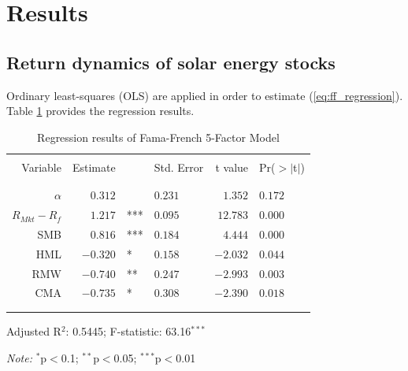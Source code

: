 \documentclass[11pt]{article}
\begin{document}
\newpage

\section{Results}

\subsection{Return dynamics of solar energy stocks}

Ordinary least-squares (OLS) are applied in order to estimate (\ref{eq:ff_regression}). Table \ref{ff_5_factors_results} provides the regression results.

\begin{table}[!htbp] \centering 
    \caption{Regression results of Fama-French 5-Factor Model} 
    \label{ff_5_factors_results} 
    \begin{threeparttable}
        \begin{tabular*}{\textwidth}{@{\extracolsep{\fill}}rrllrl} 
            \\[-1.8ex] 
            \hline
            \hline
            \\[-1.8ex] 
            Variable & Estimate & & Std. Error & t value & Pr($> |$t$|$) \\ 
            \\[-1.8ex] 
            \hline
            \\[-1.8ex] 
            $\alpha$ & $0.312$ & & $0.231$ & $1.352$ & $0.172$ \\ 
            $R_{Mkt} - R_f$ & $1.217$  & *** & $0.095$ & $12.783$ & $0.000$ \\ 
            SMB    & $0.816$  & *** & $0.184$ & $4.444$  & $0.000$ \\ 
            HML    & $-0.320$ & *   & $0.158$ & $-2.032$ & $0.044$ \\ 
            RMW    & $-0.740$ & **  & $0.247$ & $-2.993$ & $0.003$ \\ 
            CMA    & $-0.735$ & *   & $0.308$ & $-2.390$ & $0.018$ \\ 
            \\[-1.8ex] 
            \hline
            \\[-1.8ex] 
        \end{tabular*} 
        \begin{tablenotes} 
            \footnotesize
            \item Adjusted R$^{2}$:  0.5445; F-statistic: 63.16$^{***}$
            \item \textit{Note:} $^{*}$p$<$0.1; $^{**}$p$<$0.05; $^{***}$p$<$0.01
        \end{tablenotes} 
    \end{threeparttable}
\end{table} 
\end{document}
